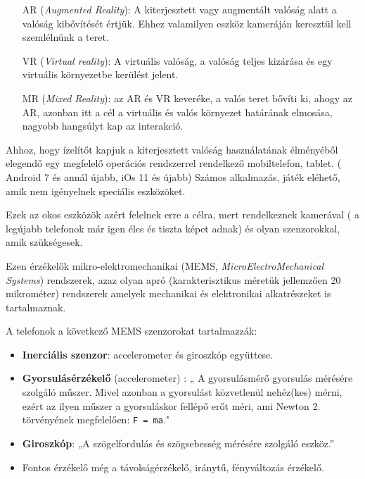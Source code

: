 
\begin{itemize}
\item[AR] (\textit{Augmented Reality}):
A kiterjesztett vagy augmentált valóság alatt a valóság kibővítését értjük. Ehhez valamilyen eszköz kameráján keresztül kell szemlélnünk a teret.
\item[VR] (\textit{Virtual reality}): A virtuális valóság, a valóság teljes kizárása és egy virtuális környezetbe kerülést jelent. 
\item[MR] (\textit{Mixed Reality}): az AR és VR keveréke, a valós teret bővíti ki, ahogy az AR, azonban itt a cél a virtuális és valós környezet határának elmosása, nagyobb hangsúlyt kap az interakció. 
\end{itemize}



Ahhoz, hogy ízelítőt kapjuk a kiterjesztett valóság használatának élményéből elegendő egy megfelelő operációs rendszerrel rendelkező mobiltelefon, tablet. ( Android 7 és annál újabb, iOs 11 és újabb)
Számos alkalmazás, játék eléhető, amik nem igényelnek speciális eszközöket. 

Ezek az okos eszközök azért felelnek erre a célra, mert rendelkeznek kamerával ( a legújabb telefonok már igen éles és tiszta képet adnak) és olyan szenzorokkal, amik  szükségesek.

Ezen érzékelők  mikro-elektromechanikai (MEMS, \textit{MicroElectroMechanical Systems}) 
rendszerek, azaz olyan apró (karakterisztikus méretük jellemzően 20 mikrométer) rendszerek amelyek mechanikai és elektronikai alkatrészeket is tartalmaznak.

A telefonok a következő MEMS szenzorokat tartalmazzák:
\begin{itemize}
\item {\bf Inerciális szenzor}: accelerometer és giroszkóp együttese.
\item {\bf Gyorsulásérzékelő} (accelerometer) : „ A gyorsulásmérő gyorsulás mérésére szolgáló műszer. Mivel azonban a gyorsulást közvetlenül nehéz(kes) mérni, ezért az ilyen műszer a gyorsuláskor fellépő erőt méri, ami Newton 2. törvényének megfelelően: \texttt{F = m\cdot a}."

\item {\bf Giroszkóp}: „A szögelfordulás és szögsebesség mérésére szolgáló eszköz.”
\item Fontos érzékelő még a távolságérzékelő, iránytű, fényváltozás érzékelő.
\end{itemize}

